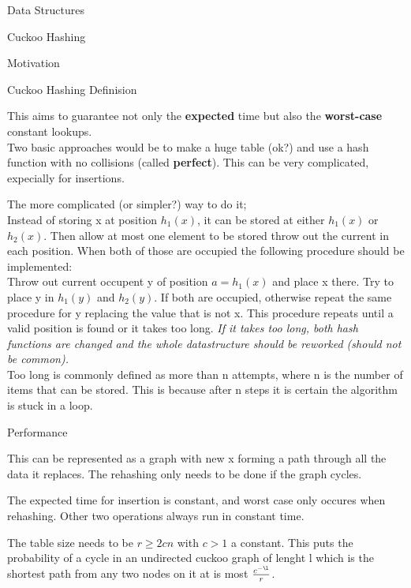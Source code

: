\documentclass[12pt, letterpaper]{article}
\begin{document}
\begin{section}{Data Structures}
\begin{subsection}{Cuckoo Hashing}
\begin{subsubsection}{Motivation}
    \end{subsubsection}

    \begin{subsubsection}{Cuckoo Hashing Definision}

      This aims to guarantee not only the \textbf{expected} time but also the
      \textbf{worst-case} constant lookups. \\
      Two basic approaches would be to make a huge table (ok?) and use a hash
      function with no collisions (called \textbf{perfect}). This can be very
      complicated, expecially for insertions.

      The more complicated (or simpler?) way to do it; \\
      Instead of storing x at position \(h_{1}(x)\), it can be stored at either
      \(h_{1}(x)\) or \(h_{2}(x)\). Then allow at most one element to be stored
      throw out the current in each position. When both of those are occupied
      the following procedure should be implemented: \\
      Throw out current occupent y of position \(a = h_{1}(x)\) and place x
      there. Try to place y in \(h_{1}(y)\) and \(h_{2}(y)\). If both are
      occupied, otherwise repeat the same procedure for y replacing the value
      that is not x. This procedure repeats until a valid position is found or
      it takes too long. \textit{If it takes too long, both hash functions are
        changed and the whole datastructure should be reworked (should not be
        common).} \\
      Too long is commonly defined as more than n attempts, where n is the
      number of items that can be stored. This is because after n steps it is
      certain the algorithm is stuck in a loop.

    \end{subsubsection}

    \begin{subsubsection}{Performance}

      This can be represented as a graph with new x forming a path through all
      the data it replaces. The rehashing only needs to be done if the graph
      cycles.

      The expected time for insertion is constant, and worst case only occures
      when rehashing. Other two operations always run in constant time.

      The table size needs to be \(r \geq 2cn\) with \(c > 1\) a constant. This
      puts the probability of a cycle in an undirected cuckoo graph of lenght
      l which is the shortest path from any two nodes on it at is most
      \(\frac{c^{-\l}}{r}\).


\end{subsubsection}
\end{subsection}
\end{section}
\end{document}

